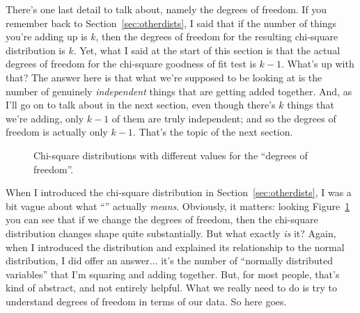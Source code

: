 There's one last detail to talk about, namely the degrees of freedom. If you remember back to Section~\ref{sec:otherdists}, I said that if the number of things you're adding up is $k$, then the degrees of freedom for the resulting chi-square distribution is $k$. Yet, what I said at the start of this section is that the actual degrees of freedom for the chi-square goodness of fit test is $k-1$. What's up with that? The answer here is that what we're supposed to be looking at is the number of genuinely {\it independent} things that are getting added together. And, as I'll go on to talk about in the next section, even though there's $k$ things that we're adding, only $k-1$ of them are truly independent; and so the degrees of freedom is actually only $k-1$. That's the topic of the next section.



\begin{figure}
\begin{center}
\caption{Chi-square distributions with different values for the ``degrees of freedom''.}
\label{fig:manychi}
\HR
\end{center}
\end{figure}

When I introduced the chi-square distribution in Section~\ref{sec:otherdists}, I was a bit vague about what ``'' actually {\it means}. Obviously, it matters: looking Figure~\ref{fig:manychi} you can see that if we change the degrees of freedom, then the chi-square distribution changes shape quite substantially. But what exactly {\it is} it? Again, when I introduced the distribution and explained its relationship to the normal distribution, I did offer an answer... it's the number of ``normally distributed variables'' that I'm squaring and adding together. But, for most people, that's kind of abstract, and not entirely helpful. What we really need to do is try to understand degrees of freedom in terms of our data. So here goes.

